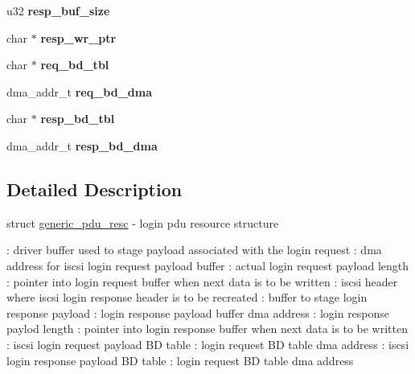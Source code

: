 \begin{DoxyCompactItemize}
\item 
\hypertarget{structgeneric__pdu__resc_abc56af2c4ca930df88c86efafae82a42}{
u32 {\bfseries resp\_\-buf\_\-size}}
\label{structgeneric__pdu__resc_abc56af2c4ca930df88c86efafae82a42}

\item 
\hypertarget{structgeneric__pdu__resc_a729ac5f1884a7c2c6fe15053dee4945d}{
char $\ast$ {\bfseries resp\_\-wr\_\-ptr}}
\label{structgeneric__pdu__resc_a729ac5f1884a7c2c6fe15053dee4945d}

\item 
\hypertarget{structgeneric__pdu__resc_a160e09c55007e632bcb093a26e491013}{
char $\ast$ {\bfseries req\_\-bd\_\-tbl}}
\label{structgeneric__pdu__resc_a160e09c55007e632bcb093a26e491013}

\item 
\hypertarget{structgeneric__pdu__resc_acfa7579def0f66da85c54252d1773ba2}{
dma\_\-addr\_\-t {\bfseries req\_\-bd\_\-dma}}
\label{structgeneric__pdu__resc_acfa7579def0f66da85c54252d1773ba2}

\item 
\hypertarget{structgeneric__pdu__resc_ab7427025b07979cda474c437fe3df3e7}{
char $\ast$ {\bfseries resp\_\-bd\_\-tbl}}
\label{structgeneric__pdu__resc_ab7427025b07979cda474c437fe3df3e7}

\item 
\hypertarget{structgeneric__pdu__resc_aeda17d3354bd634eb6d721b1decd209b}{
dma\_\-addr\_\-t {\bfseries resp\_\-bd\_\-dma}}
\label{structgeneric__pdu__resc_aeda17d3354bd634eb6d721b1decd209b}

\end{DoxyCompactItemize}


\subsection{Detailed Description}
struct \hyperlink{structgeneric__pdu__resc}{generic\_\-pdu\_\-resc} -\/ login pdu resource structure

: driver buffer used to stage payload associated with the login request : dma address for iscsi login request payload buffer : actual login request payload length : pointer into login request buffer when next data is to be written : iscsi header where iscsi login response header is to be recreated : buffer to stage login response payload : login response payload buffer dma address : login response paylod length : pointer into login response buffer when next data is to be written : iscsi login request payload BD table : login request BD table dma address : iscsi login response payload BD table : login request BD table dma address

